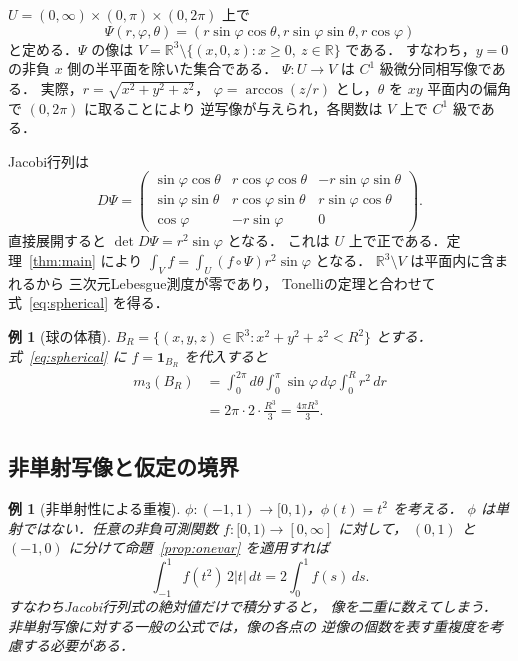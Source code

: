 \documentclass[a5paper,10pt,onecolumn]{jsarticle}
\makeatletter
\theoremstyle{mathnotetheorem}
\newtheorem{example}[theorem]{例}
\renewcommand{\proofname}{証明}
\renewenvironment{proof}[1][\proofname]{%
  \par\pushQED{\qed}\normalfont\topsep4\p@\@plus2\p@\relax
  \trivlist\item[\hskip\labelsep\bfseries #1]\ignorespaces
}{\popQED\endtrivlist\@endpefalse}
\newcommand{\R}{\mathbb{R}}
\newcommand{\abs}[1]{\lvert #1\rvert}
\makeatother
\begin{document}
\begin{proof}
$U=(0,\infty)\times(0,\pi)\times(0,2\pi)$ 上で
\[
 \Psi(r,\varphi,\theta)
 =(r\sin\varphi\cos\theta,
   r\sin\varphi\sin\theta,r\cos\varphi)
\]
と定める．$\Psi$ の像は
$V=\R^3\setminus\{(x,0,z):x\ge0,\ z\in\R\}$ である．
すなわち，$y=0$ の非負 $x$ 側の半平面を除いた集合である．
$\Psi:U\to V$ は $C^1$ 級微分同相写像である．
実際，$r=\sqrt{x^2+y^2+z^2}$，
$\varphi=\arccos(z/r)$ とし，$\theta$ を
$xy$ 平面内の偏角で $(0,2\pi)$ に取ることにより
逆写像が与えられ，各関数は $V$ 上で $C^1$ 級である．

Jacobi行列は
\[
 D\Psi=\begin{pmatrix}
 \sin\varphi\cos\theta&r\cos\varphi\cos\theta&-r\sin\varphi\sin\theta\\
 \sin\varphi\sin\theta&r\cos\varphi\sin\theta&r\sin\varphi\cos\theta\\
 \cos\varphi&-r\sin\varphi&0
 \end{pmatrix}.
\]
直接展開すると $\det D\Psi=r^2\sin\varphi$ となる．
これは $U$ 上で正である．定理~\ref{thm:main} により
$\int_V f=\int_U(f\circ\Psi)r^2\sin\varphi$ となる．
$\R^3\setminus V$ は平面内に含まれるから
三次元Lebesgue測度が零であり，
Tonelliの定理と合わせて式~\eqref{eq:spherical} を得る．
\end{proof}

\begin{example}[球の体積]
$B_R=\{(x,y,z)\in\R^3:x^2+y^2+z^2<R^2\}$ とする．
式~\eqref{eq:spherical} に $f=\mathbf1_{B_R}$ を代入すると
\begin{align*}
 m_3(B_R)
 &=\int_0^{2\pi}d\theta\int_0^\pi\sin\varphi\,d\varphi
  \int_0^R r^2\,dr\\
 &=2\pi\cdot2\cdot\frac{R^3}{3}
 =\frac{4\pi R^3}{3}.
\end{align*}
\end{example}

\subsection{非単射写像と仮定の境界}

\begin{example}[非単射性による重複]\label{ex:noninjective}
$\phi:(-1,1)\to[0,1)$，$\phi(t)=t^2$ を考える．
$\phi$ は単射ではない．任意の非負可測関数
$f:[0,1)\to[0,\infty]$ に対して，
$(0,1)$ と $(-1,0)$ に分けて命題~\ref{prop:onevar} を適用すれば
\[
 \int_{-1}^1 f(t^2)\,2\abs t\,dt
 =2\int_0^1 f(s)\,ds.
\]
すなわちJacobi行列式の絶対値だけで積分すると，
像を二重に数えてしまう．
非単射写像に対する一般の公式では，像の各点の
逆像の個数を表す重複度を考慮する必要がある．
\end{example}
\end{document}
